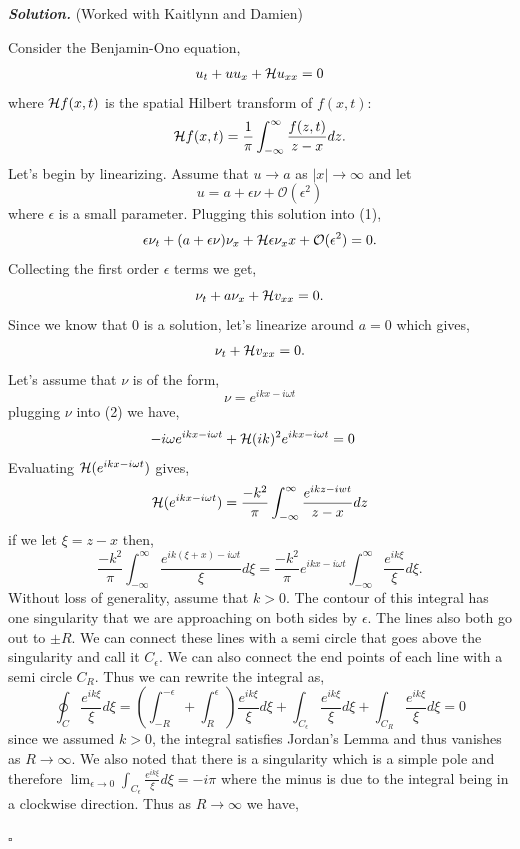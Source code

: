 \documentclass[12pt]{report}
\newenvironment{solution}[1][\it{Solution}]{\textbf{#1. } }{$\square$}
\def\O{{\mathcal{O}}}
\begin{document}
\begin{solution}
    \noindent
    (Worked with Kaitlynn and Damien)

    \noindent
    Consider the Benjamin-Ono equation,
    \begin{align}
        u_t+u u_x+{\cal H}u_{xx}=0
    \end{align}
    where ${\cal H}f(x,t)$ is the spatial Hilbert transform of
    $f(x,t)$:
    \[
    {\cal H}f(x,t)=\frac{1}{\pi}\int_{-\infty}^\infty \frac{f(z,t)}{z-x}dz.
    \]
    Let's begin by linearizing. Assume that $u \rightarrow a$ as $|x| \rightarrow \infty$ and let $$u = a + \epsilon \nu + \O(\epsilon^2)$$
    where $\epsilon$ is a small parameter. Plugging this solution into (1),
    \[
    \epsilon \nu_t + (a + \epsilon\nu)\nu_x + {\cal H} \epsilon \nu_xx + \O(\epsilon^2) = 0.
    \]
    Collecting the first order $\epsilon$ terms we get,
    \[
    \nu_t + a \nu_x + {\cal H}v_{xx} = 0.
    \]
    Since we know that $0$ is a solution, let's linearize around $a = 0$ which gives,
    \begin{align}
        \nu_t + {\cal H}v_{xx} = 0.
    \end{align}
    Let's assume that $\nu$ is of the form,
    \[
    \nu = e^{i k x - i \omega t}
    \]
    plugging $\nu$ into (2) we have,
    \begin{align}
        -i\omega e^{i k x - i \omega t} +   {\cal H} (ik)^2 e^{i k x - i \omega t} &= 0
    \end{align}
    Evaluating ${\cal H}(e^{i k x - i \omega t})$ gives,
    \[
        {\cal H}(e^{i k x - i \omega t}) = \frac{-k^2}{\pi}\int_{-\infty}^{\infty} \frac{e^{ikz - iwt}}{z - x}dz
    \]
    if we let $\xi = z -x$ then,
    \[
        \frac{-k^2}{\pi}\int_{-\infty}^{\infty} \frac{e^{ik(\xi + x) - i\omega t}}{\xi}d\xi = \frac{-k^2}{\pi} e^{ikx - i\omega t} \int_{-\infty}^{\infty} \frac{e^{ik\xi}}{\xi}d\xi.
    \]
    Without loss of generality, assume that $k > 0$. The contour of this integral has one singularity that we are approaching on both sides by $\epsilon$. The lines also both go out to $\pm R$. We can connect these lines with a semi circle that goes above the singularity and call it $C_\epsilon$. We can also connect the end points of each line with a semi circle $C_R$. Thus we can rewrite the integral as,
    \[
        \oint_C \frac{e^{ik\xi}}{\xi}d\xi = \left( \int_{-R}^{-\epsilon} + \int_{R}^{\epsilon}\right) \frac{e^{ik\xi}}{\xi}d\xi + \int_{C_\epsilon} \frac{e^{ik\xi}}{\xi}d\xi + \int_{C_R}\frac{e^{ik\xi}}{\xi}d\xi = 0
    \] 
    since we assumed $k > 0$, the integral satisfies Jordan's Lemma and thus vanishes as $R \rightarrow \infty$. We also noted that there is a singularity which is a simple pole and therefore $\lim_{\epsilon \rightarrow 0}\int_{C_\epsilon} \frac{e^{ik\xi}}{\xi}d\xi = -i \pi$ where the minus is due to the integral being in a clockwise direction. Thus as $R \rightarrow \infty$ we have,

\end{solution}
\end{document}
